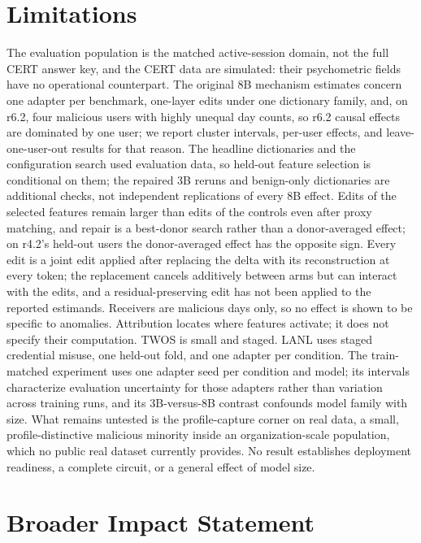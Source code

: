 \documentclass[10pt]{article} %
\begin{document}


\section{Limitations}
\label{sec:limitations}

The evaluation population is the matched active-session domain, not the full
CERT answer key, and the CERT data are simulated: their psychometric fields
have no operational counterpart. The original 8B mechanism estimates concern
one adapter per benchmark, one-layer edits under one dictionary family, and,
on r6.2, four malicious users with highly unequal day counts, so r6.2 causal
effects are dominated by one user; we report cluster intervals, per-user
effects, and leave-one-user-out results for that reason. The headline
dictionaries and the configuration search used evaluation data, so held-out
feature selection is conditional on them; the repaired 3B reruns and
benign-only dictionaries are additional checks, not independent replications
of every 8B effect. Edits of the selected features remain larger than edits
of the controls even after proxy matching, and repair is a best-donor search
rather than a donor-averaged effect; on r4.2's held-out users the
donor-averaged effect has the opposite sign. Every edit is a joint edit
applied after replacing the delta with its reconstruction at every token; the
replacement cancels additively between arms but can interact with the edits,
and a residual-preserving edit has not been applied to the reported
estimands. Receivers are malicious days only, so no effect is shown to be
specific to anomalies. Attribution locates where features
activate; it does not specify their computation. TWOS is small and staged.
LANL uses staged credential misuse, one held-out fold, and one adapter per
condition. The train-matched experiment uses one adapter seed per condition
and model; its intervals characterize evaluation uncertainty for those
adapters rather than variation across training runs, and its 3B-versus-8B
contrast confounds model family with size. What remains untested is the
profile-capture corner on real data, a small, profile-distinctive malicious
minority inside an organization-scale population, which no public real
dataset currently provides. No result establishes deployment readiness, a
complete circuit, or a general effect of model size.

\section{Broader Impact Statement}
\end{document}
